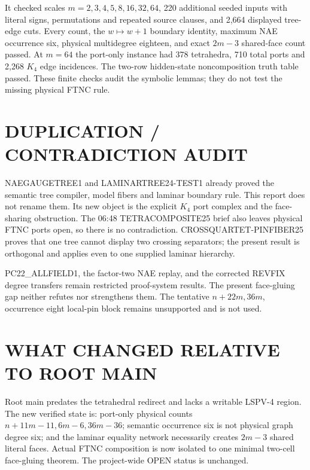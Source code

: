 \documentclass[11pt]{article}
\begin{document}
It checked scales $m=2,3,4,5,8,16,32,64$, 220 additional seeded inputs with
literal signs, permutations and repeated source clauses, and 2,664 displayed
tree-edge cuts.  Every count, the $w\mapsto w+1$ boundary identity, maximum
NAE occurrence six, physical multidegree eighteen, and exact $2m-3$ shared-face
count passed.  At $m=64$ the port-only instance had 378 tetrahedra, 710 total
ports and 2,268 $K_4$ edge incidences.  The two-row hidden-state
noncomposition truth table passed.  These finite checks audit the symbolic
lemmas; they do not test the missing physical FTNC rule.

\section{DUPLICATION / CONTRADICTION AUDIT}
NAEGAUGETREE1 and LAMINARTREE24-TEST1 already proved the semantic tree compiler,
model fibers and laminar boundary rule.  This report does not rename them.  Its
new object is the explicit $K_4$ port complex and the face-sharing obstruction.
The 06:48 TETRACOMPOSITE25 brief also leaves physical FTNC ports open, so there
is no contradiction.  CROSSQUARTET-PINFIBER25 proves that one tree cannot
display two crossing separators; the present result is orthogonal and applies
even to one supplied laminar hierarchy.

PC22\_ALLFIELD1, the factor-two NAE replay, and the corrected REVFIX degree
transfers remain restricted proof-system results.  The present face-gluing gap
neither refutes nor strengthens them.  The tentative $n+22m,36m$, occurrence
eight local-pin block remains unsupported and is not used.

\section{WHAT CHANGED RELATIVE TO ROOT MAIN}
Root main predates the tetrahedral redirect and lacks a writable LSPV-4 region.
The new verified state is: port-only physical counts
$n+11m-11,6m-6,36m-36$; semantic occurrence six is not physical graph degree
six; and the laminar equality network necessarily creates $2m-3$ shared
literal faces.  Actual FTNC composition is now isolated to one minimal
two-cell face-gluing theorem.  The project-wide OPEN status is unchanged.
\end{document}

